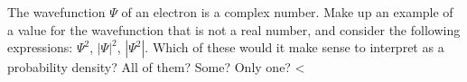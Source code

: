 The wavefunction $\Psi$ of an electron is a complex number. Make up an
example of a value for the wavefunction that is not a real number, and
consider the following expressions: $\Psi^2$, $|\Psi|^2$, $|\Psi^2|$.
Which of these would it make sense to interpret as a probability density?
All of them? Some? Only one?
<%
